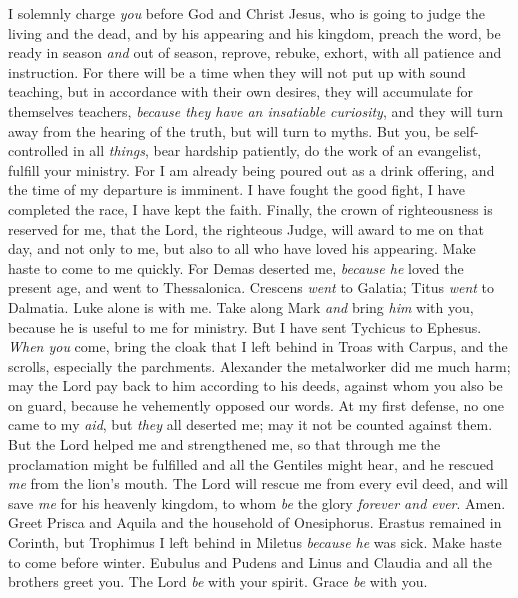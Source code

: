 \begin{biblechapter} %
 I solemnly charge \textit{you} before God and Christ Jesus, who is going to judge the living and the dead, and by his appearing and his kingdom,
\verse preach the word, be ready in season \textit{and} out of season, reprove, rebuke, exhort, with all patience and instruction.
\verse For there will be a time when they will not put up with sound teaching, but in accordance with their own desires, they will accumulate for themselves teachers, \textit{because they have an insatiable curiosity},
\verse and they will turn away from the hearing of the truth, but will turn to myths.
\verse But you, be self-controlled in all \textit{things}, bear hardship patiently, do the work of an evangelist, fulfill your ministry.
\verse For I am already being poured out as a drink offering, and the time of my departure is imminent.
\verse I have fought the good fight, I have completed the race, I have kept the faith.
\verse Finally, the crown of righteousness is reserved for me, that the Lord, the righteous Judge, will award to me on that day, and not only to me, but also to all who have loved his appearing.
 Make haste to come to me quickly.
\verse For Demas deserted me, \textit{because he} loved the present age, and went to Thessalonica. Crescens \textit{went} to Galatia; Titus \textit{went} to Dalmatia.
\verse Luke alone is with me. Take along Mark \textit{and} bring \textit{him} with you, because he is useful to me for ministry.
\verse But I have sent Tychicus to Ephesus.
\verse \textit{When you} come, bring the cloak that I left behind in Troas with Carpus, and the scrolls, especially the parchments.
\verse Alexander the metalworker did me much harm; may the Lord pay back to him according to his deeds,
\verse against whom you also be on guard, because he vehemently opposed our words.
\verse At my first defense, no one came to my \textit{aid}, but \textit{they} all deserted me; may it not be counted against them.
\verse But the Lord helped me and strengthened me, so that through me the proclamation might be fulfilled and all the Gentiles might hear, and he rescued \textit{me} from the lion’s mouth.
\verse The Lord will rescue me from every evil deed, and will save \textit{me} for his heavenly kingdom, to whom \textit{be} the glory \textit{forever and ever}. Amen.
 Greet Prisca and Aquila and the household of Onesiphorus.
\verse Erastus remained in Corinth, but Trophimus I left behind in Miletus \textit{because he} was sick.
\verse Make haste to come before winter. Eubulus and Pudens and Linus and Claudia and all the brothers greet you.
\verse The Lord \textit{be} with your spirit. Grace \textit{be} with you.
\end{biblechapter}


